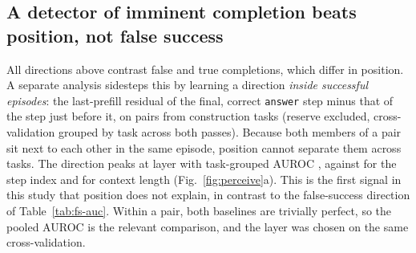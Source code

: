 \subsection{A detector of imminent completion beats position, not false success}
\label{sec:perceive}
All directions above contrast false and true completions, which differ in position. A separate analysis sidesteps this by learning a direction \emph{inside successful episodes}: the last-prefill residual of the final, correct \texttt{answer} step minus that of the step just before it, on \pcPairs{} pairs from \pcTasks{} construction tasks (reserve excluded, cross-validation grouped by task across both passes). Because both members of a pair sit next to each other in the same episode, position cannot separate them across tasks. The direction peaks at layer \pcLayer{} with task-grouped AUROC \pcAuc, against \pcBaseStep{} for the step index and \pcBaseCtx{} for context length (Fig.~\ref{fig:perceive}a). This is the first signal in this study that position does not explain, in contrast to the false-success direction of Table~\ref{tab:fs-auc}. Within a pair, both baselines are trivially perfect, so the pooled AUROC is the relevant comparison, and the layer was chosen on the same cross-validation.

